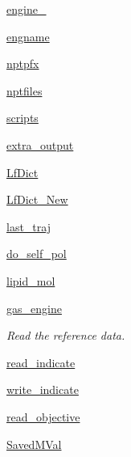 \begin{DoxyCompactItemize}
\item 
\hyperlink{classforcebalance_1_1gmxio_1_1Lipid__GMX_ab061082fc4fab92a416a08ef6bab40b5}{engine\-\_\-}
\item 
\hyperlink{classforcebalance_1_1gmxio_1_1Lipid__GMX_a936dee9675f5323cb49f7c918c667898}{engname}
\item 
\hyperlink{classforcebalance_1_1gmxio_1_1Lipid__GMX_a7c9c1bf1e38d47bcdaa388e271cf3e9d}{nptpfx}
\item 
\hyperlink{classforcebalance_1_1gmxio_1_1Lipid__GMX_ab1c70f161f67c7236281304d0d5343e4}{nptfiles}
\item 
\hyperlink{classforcebalance_1_1gmxio_1_1Lipid__GMX_a1fa6e5f0984375c3b0e69d39b917a328}{scripts}
\item 
\hyperlink{classforcebalance_1_1gmxio_1_1Lipid__GMX_a6a0cb2f82691a333a63f9280c29da7d8}{extra\-\_\-output}
\item 
\hyperlink{classforcebalance_1_1gmxio_1_1Lipid__GMX_a3ce3bcbff2201f763b17d283b452fe78}{Lf\-Dict}
\item 
\hyperlink{classforcebalance_1_1gmxio_1_1Lipid__GMX_aef1869891e1687004a5bcc39cb015122}{Lf\-Dict\-\_\-\-New}
\item 
\hyperlink{classforcebalance_1_1gmxio_1_1Lipid__GMX_a2276affa5e7dc492a98b3632ee7efa9f}{last\-\_\-traj}
\item 
\hyperlink{classforcebalance_1_1lipid_1_1Lipid_a20b017fb691f904bd18bd7d9ff1c91fc}{do\-\_\-self\-\_\-pol}
\item 
\hyperlink{classforcebalance_1_1lipid_1_1Lipid_a1e5ac68a7b79b3481acb17ed86db8aa1}{lipid\-\_\-mol}
\item 
\hyperlink{classforcebalance_1_1lipid_1_1Lipid_ad64df596db06f1dbdf49e0acca65534f}{gas\-\_\-engine}
\begin{DoxyCompactList}\small\item\em Read the reference data. \end{DoxyCompactList}\item 
\hyperlink{classforcebalance_1_1lipid_1_1Lipid_af5dfb680e8dc79f92c8e882f72f15559}{read\-\_\-indicate}
\item 
\hyperlink{classforcebalance_1_1lipid_1_1Lipid_abd1d6916a71c0529ad86dffd5d1f033c}{write\-\_\-indicate}
\item 
\hyperlink{classforcebalance_1_1lipid_1_1Lipid_a0edba63f8f5fbc3f8c51df153a886db9}{read\-\_\-objective}
\item 
\hyperlink{classforcebalance_1_1lipid_1_1Lipid_a07e86c96c0045df320ffde881315fec3}{Saved\-M\-Val}

\end{DoxyCompactItemize}
